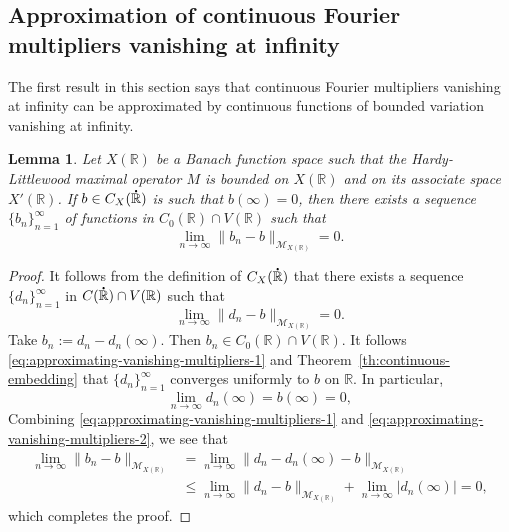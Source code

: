 \documentclass[reqno]{amsproc}
\newcommand{\cM}{\mathcal{M}}
\newcommand{\dR}{{\bf\dot{\R}}}
\newcommand{\R}{\mathbb{R}}
\newtheorem{lemma}[theorem]{Lemma}
\theoremstyle{definition}
\theoremstyle{remark}
\numberwithin{equation}{section}
\begin{document}
\subsection{Approximation of continuous Fourier multipliers vanishing 
at infinity}
The first result in this section says that continuous Fourier
multipliers vanishing at infinity can be approximated by continuous
functions of bounded variation vanishing at infinity.
\begin{lemma}\label{le:approximating-vanishing-multipliers}
Let $X(\R)$ be a Banach function space such that the Hardy-Little\-wood
maximal operator $M$ is bounded on $X(\R)$ and on its associate
space $X'(\R)$. If $b\in C_X(\dR)$ is such that $b(\infty)=0$, then
there exists a sequence $\{b_n\}_{n=1}^\infty$ of functions in
$C_0(\R)\cap V(\R)$ such that
\[
\lim_{n\to\infty}\|b_n-b\|_{\cM_{X(\R)}}=0.
\]
\end{lemma}
\begin{proof}
It follows from the definition of $C_X(\dR)$ that there exists a sequence
$\{d_n\}_{n=1}^\infty$ in $C(\dR)\cap V(\R)$ such that
\begin{equation}\label{eq:approximating-vanishing-multipliers-1}
\lim_{n\to\infty}\|d_n-b\|_{\cM_{X(\R)}}=0.
\end{equation}
Take $b_n:=d_n-d_n(\infty)$. Then $b_n\in C_0(\R)\cap V(\R)$. It follows
\eqref{eq:approximating-vanishing-multipliers-1} and 
Theorem~\ref{th:continuous-embedding} that $\{d_n\}_{n=1}^\infty$ converges
uniformly to $b$ on $\R$. In particular,
\begin{equation}\label{eq:approximating-vanishing-multipliers-2}
\lim_{n\to\infty}d_n(\infty)=b(\infty)=0,
\end{equation}
Combining \eqref{eq:approximating-vanishing-multipliers-1} and
\eqref{eq:approximating-vanishing-multipliers-2}, we see that
\begin{align*}
\lim_{n\to\infty}\|b_n-b\|_{\cM_{X(\R)}}
&=
\lim_{n\to\infty}\|d_n-d_n(\infty)-b\|_{\cM_{X(\R)}}
\\
&\le
\lim_{n\to\infty}\|d_n-b\|_{\cM_{X(\R)}}
+\lim_{n\to\infty}|d_n(\infty)|=0,
\end{align*}
which completes the proof.
\end{proof}

\end{document}
